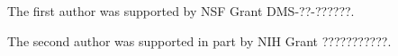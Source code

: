 \documentclass[aos]{imsart}
\theoremstyle{plain}
\begin{document}
\begin{funding}
The first author was supported by NSF Grant DMS-??-??????.

The second author was supported in part by NIH Grant ???????????.
\end{funding}

\end{document}

